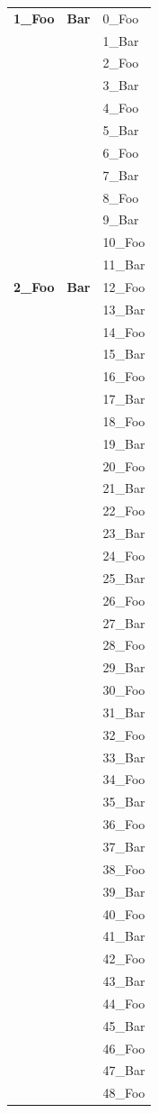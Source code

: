 \begin{Chapter}
\begin{longtable}{|p{}|p{}|p{}|}
\textbf{1\_Foo}& \textbf{Bar}& 0\_Foo \\
&&1\_Bar\\
&&2\_Foo\\
&&3\_Bar\\
&&4\_Foo\\
&&5\_Bar\\
&&6\_Foo\\
&&7\_Bar\\
&&8\_Foo\\
&&9\_Bar\\
&&10\_Foo\\
&&11\_Bar\\
\hline
\textbf{2\_Foo}& \textbf{Bar}&12\_Foo\\
&&13\_Bar\\
&&14\_Foo\\
&&15\_Bar\\
&&16\_Foo\\
&&17\_Bar\\
&&18\_Foo\\
&&19\_Bar\\
&&20\_Foo\\
&&21\_Bar\\
&&22\_Foo\\
&&23\_Bar\\
&&24\_Foo\\
&&25\_Bar\\
&&26\_Foo\\
&&27\_Bar\\
&&28\_Foo\\
&&29\_Bar\\
&&30\_Foo\\
&&31\_Bar\\
&&32\_Foo\\
&&33\_Bar\\
&&34\_Foo\\
&&35\_Bar\\
&&36\_Foo\\
&&37\_Bar\\
&&38\_Foo\\
&&39\_Bar\\
&&40\_Foo\\
&&41\_Bar\\
&&42\_Foo\\
&&43\_Bar\\
&&44\_Foo\\
&&45\_Bar\\
&&46\_Foo\\
&&47\_Bar\\
&&48\_Foo\\

\end{longtable}
\end{Chapter}
